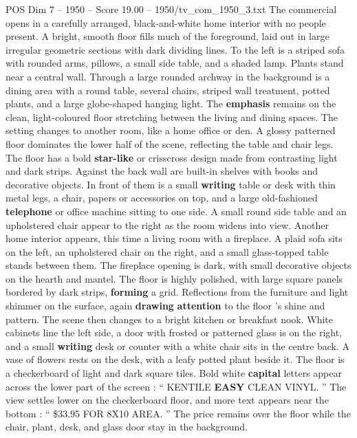 \begin{textsample}{POS Dim 7 – 1950 – Score 19.00 – 1950/tv\_com\_1950\_3.txt}  \label{ex:f7_pos_005}
The commercial opens in a carefully arranged, black-and-white home interior with no people present.
A bright, smooth floor fills much of the foreground, laid out in large irregular geometric sections with dark dividing lines.
To the left is a striped sofa with rounded arms, pillows, a small side table, and a shaded lamp.
Plants stand near a central wall.
Through a large rounded archway in the background is a dining area with a round table, several chairs, striped wall treatment, potted plants, and a large globe-shaped hanging light.
The \textbf{emphasis} remains on the clean, light-coloured floor stretching between the living and dining spaces.
The setting changes to another room, like a home office or den.
A glossy patterned floor dominates the lower half of the scene, reflecting the table and chair legs.
The floor has a bold \textbf{star-like} or crisscross design made from contrasting light and dark strips.
Against the back wall are built-in shelves with books and decorative objects.
In front of them is a small \textbf{writing} table or desk with thin metal legs, a chair, papers or accessories on top, and a large old-fashioned \textbf{telephone} or office machine sitting to one side.
A small round side table and an upholstered chair appear to the right as the room widens into view.
Another home interior appears, this time a living room with a fireplace.
A plaid sofa sits on the left, an upholstered chair on the right, and a small glass-topped table stands between them.
The fireplace opening is dark, with small decorative objects on the hearth and mantel.
The floor is highly polished, with large square panels bordered by dark strips, \textbf{forming} a grid.
Reflections from the furniture and light shimmer on the surface, again \textbf{drawing} \textbf{attention} to the floor ’s shine and pattern.
The scene then changes to a bright kitchen or breakfast nook.
White cabinets line the left side, a door with frosted or patterned glass is on the right, and a small \textbf{writing} desk or counter with a white chair sits in the centre back.
A vase of flowers rests on the desk, with a leafy potted plant beside it.
The floor is a checkerboard of light and dark square tiles.
Bold white \textbf{capital} letters appear across the lower part of the screen : “ KENTILE \textbf{EASY} CLEAN VINYL. ” The view settles lower on the checkerboard floor, and more text appears near the bottom : “ \$33.95 FOR 8X10 AREA. ” The price remains over the floor while the chair, plant, desk, and glass door stay in the background.

\end{textsample}
